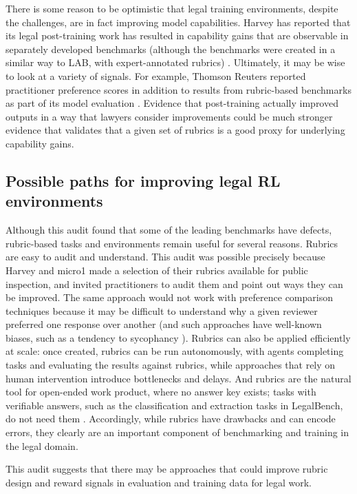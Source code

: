 \documentclass[11pt]{article}
\begin{document}
There is some reason to be optimistic that legal training environments, despite the challenges, are in fact improving model capabilities. Harvey has reported that its legal post-training work has resulted in capability gains that are observable in separately developed benchmarks (although the benchmarks were created in a similar way to LAB, with expert-annotated rubrics) \citep{harveyTenet}. Ultimately, it may be wise to look at a variety of signals. For example, Thomson Reuters reported practitioner preference scores in addition to results from rubric-based benchmarks as part of its model evaluation \citep{thomson}. Evidence that post-training actually improved outputs in a way that lawyers consider improvements could be much stronger evidence that validates that a given set of rubrics is a good proxy for underlying capability gains. 


\subsection{Possible paths for improving legal RL environments}
\label{sec:improve}
\label{sec:environments}

Although this audit found that some of the leading benchmarks have defects, rubric-based tasks and environments remain useful for several reasons. Rubrics are easy to audit and understand. This audit was possible precisely because Harvey and micro1 made a selection of their rubrics available for public inspection, and invited practitioners to audit them and point out ways they can be improved. The same approach would not work with preference comparison techniques because it may be difficult to understand why a given reviewer preferred one response over another (and such approaches have well-known biases, such as a tendency to sycophancy \citep{sycophancy}). Rubrics can also be applied efficiently at scale: once created, rubrics can be run autonomously, with agents completing tasks and evaluating the results against rubrics, while approaches that rely on human intervention introduce bottlenecks and delays. And rubrics are the natural tool for open-ended work product, where no answer key exists; tasks with verifiable answers, such as the classification and extraction tasks in LegalBench, do not need them \citep{legalbench}. Accordingly, while rubrics have drawbacks and can encode errors, they clearly are an important component of benchmarking and training in the legal domain.

This audit suggests that there may be approaches that could improve rubric design and reward signals in evaluation and training data for legal work.
\end{document}
